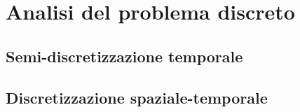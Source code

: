\chapter{Analisi del problema discreto}
\label{chap:Discontinuos}

\section{Semi-discretizzazione temporale}

\section{Discretizzazione spaziale-temporale}